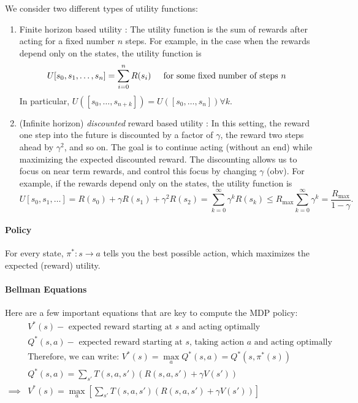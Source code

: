\documentclass{article}
\begin{document}
We consider two different types of utility functions:

\begin{enumerate}
	\item Finite horizon based utility : The utility function is the sum of rewards after acting for a fixed number $n$ steps. For example, in the case when the rewards depend only on the states, the utility function is
		\[U[s_0,s_1,\ldots,s_n]=\sum\limits_{i=0}^n R(s_i)\hspace{.2in}\text{for some fixed number of steps } n\] In particular, $U\left([s_0,\ldots,s_{n+k}]\right)=U\left([s_0,\ldots,s_n]\right)\forall k$.
	\item (Infinite horizon) \emph{discounted} reward based utility : In this setting, the reward one step into the future is discounted by a factor of $\gamma$, the reward two steps ahead by $\gamma^2$, and so on. The goal is to continue acting (without an end) while maximizing the expected discounted reward. The discounting allows us to focus on near term rewards, and control this focus by changing $\gamma$ (obv). For example, if the rewards depend only on the states, the utility function is 
		$$ U[s_0,s_1,\ldots]=R(s_0)+\gamma R(s_1)+\gamma^2 R(s_2)=\sum\limits_{k=0}^\infty \gamma^k R(s_k)\leq R_{\text{max}}\sum\limits_{k=0}^\infty \gamma^k=\frac{R_{\text{max}}}{1-\gamma}.$$
\end{enumerate}

\paragraph{Policy}
For every state, $\pi^* : s\to a$ tells you the best possible action, which maximizes the expected (reward) utility.
\paragraph{Bellman Equations}
Here are a few important equations that are key to compute the MDP policy:
\begin{align*}&V^*(s)-\text{ expected reward starting at $s$ and acting optimally}\\
	&Q^*(s,a)-\text{ expected reward starting at $s$, taking action $a$ and acting optimally}\\
	&\text{Therefore, we can write: }V^*(s)=\max_aQ^*(s,a)=Q^*\left(s,\pi^*(s)\right)\\
	&Q^*(s,a)=\sum\limits_{s'}T(s,a,s')\left(R(s,a,s')+\gamma V(s')\right)\\
	\implies&V^*(s)=\max_a\left[\sum\limits_{s'}T(s,a,s')\left(R(s,a,s')+\gamma V(s')\right)\right]
\end{align*}
\end{document}
